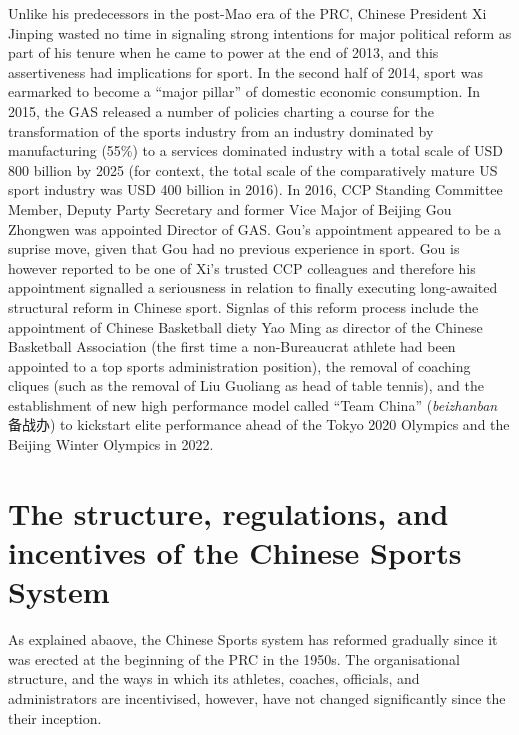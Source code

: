 {Unlike his predecessors in the post-Mao era of the PRC, Chinese President Xi Jinping wasted no time in signaling strong intentions for major political reform as part of his tenure when he came to power at the end of 2013, and this assertiveness had implications for sport.  In the second half of 2014, sport was earmarked to become a ``major pillar'' of domestic economic consumption. In 2015, the GAS released a number of policies charting a course for the transformation of the sports industry from an industry dominated by manufacturing (55\%) to a services dominated industry with a total scale of USD 800 billion by 2025 (for context, the total scale of the comparatively mature US sport industry was USD 400 billion in 2016).  In 2016, CCP Standing Committee Member, Deputy Party Secretary and former Vice Major of Beijing Gou Zhongwen was appointed Director of GAS.  Gou's appointment appeared to be a suprise move, given that Gou had no previous experience in sport. Gou is however reported to be one of Xi's trusted CCP colleagues and therefore his appointment signalled a seriousness in relation to finally executing long-awaited structural reform in Chinese sport.  Signlas of this reform process include the appointment of Chinese Basketball diety Yao Ming as director of the Chinese Basketball Association (the first time a non-Bureaucrat athlete had been appointed to a top sports administration position), the removal of coaching cliques (such as the removal of Liu Guoliang as head of table tennis), and the establishment of new high performance model called ``Team China'' (\textit{beizhanban} 备战办) to kickstart elite performance ahead of the Tokyo 2020 Olympics and the Beijing Winter Olympics in 2022.





\section{The structure, regulations, and incentives of the Chinese Sports System}

As explained abaove, the Chinese Sports system has reformed gradually since it was erected at the beginning of the PRC in the 1950s. The organisational structure, and the ways in which its athletes, coaches, officials, and administrators are incentivised, however, have not changed significantly since the their inception.

}
